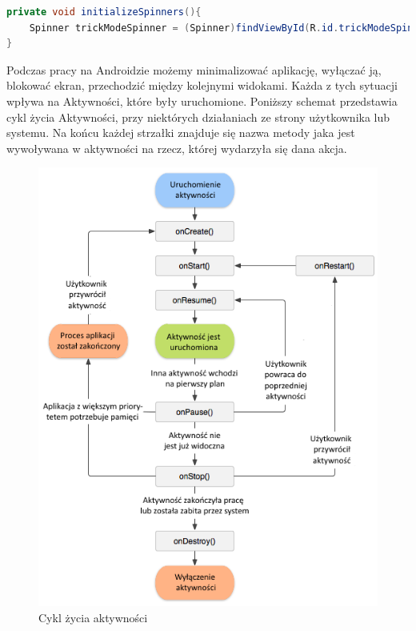 \documentclass{article}
\numberwithin{equation}{section}
\begin{document}
\begin{lstlisting}[language=Java]
private void initializeSpinners(){
    Spinner trickModeSpinner = (Spinner)findViewById(R.id.trickModeSpinner);
}
\end{lstlisting}
\par
Podczas pracy na Androidzie możemy minimalizować aplikację, wyłączać ją, blokować ekran, przechodzić między kolejnymi widokami. Każda z tych sytuacji wpływa na Aktywności, które były uruchomione. Poniższy schemat przedstawia cykl życia Aktywności, przy niektórych działaniach ze strony użytkownika lub systemu. Na końcu każdej strzałki znajduje się nazwa metody jaka jest wywoływana w aktywności na rzecz, której wydarzyła się dana akcja.
\begin{figure}[H]
\includegraphics[scale=0.9]{activity_lifecycle_pl.png}
\caption{Cykl życia aktywności\citep{activity}}
\end{figure}
\end{document}
